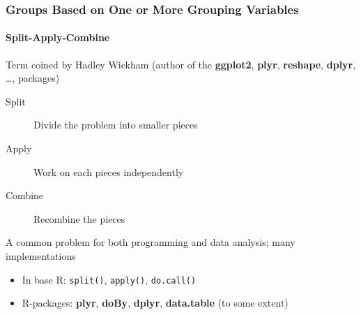 \documentclass[paper=screen,mathserif]{beamer}\usepackage[]{graphicx}\usepackage[]{color}
\newcommand{\ft}[1]{\frametitle{#1}}
\newcommand{\fst}[1]{\framesubtitle{#1}}
\begin{document}
\begin{frame}[fragile]
  \ft{Groups Based on One or More Grouping Variables}
  \fst{Split-Apply-Combine}
  
  Term coined by Hadley Wickham (author of the {\bf ggplot2}, {\bf plyr},
  {\bf reshape}, {\bf dplyr}, \dots, packages)
  \begin{description}
  \item[Split] Divide the problem into smaller pieces
  \item[Apply] Work on each pieces independently
  \item[Combine] Recombine the pieces
  \end{description}
  A common problem for both programming and data analysis; many
  implementations
  \begin{itemize}
  \item In base R: {\tt split()}, {\tt *apply()}, {\tt do.call()}
  \item R-packages: {\bf plyr}, {\bf doBy}, {\bf dplyr}, {\bf
      data.table} (to some extent) 
  \end{itemize}
\end{frame}
\end{document}
